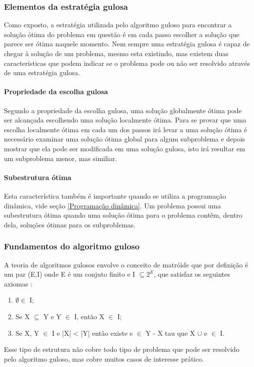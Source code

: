 \subsubsection{Elementos da estratégia gulosa}
Como exposto, a estratégia utilizada pelo algoritmo guloso para encontrar a solução ótima do problema em questão é em cada passo escolher a solução que parece ser ótima naquele momento. Nem sempre uma estratégia gulosa é capaz de chegar à solução de um problema, mesmo esta existindo, mas existem duas características que podem indicar se o problema pode ou não ser resolvido através de uma estratégia gulosa.
\paragraph{Propriedade da escolha gulosa}
Segundo a propriedade da escolha gulosa, uma solução globalmente ótima pode ser alcançada escolhendo uma solução localmente ótima. Para se provar que uma escolha localmente ótima em cada um dos passos irá levar a uma solução ótima é necessário examinar uma solução ótima global para algum subproblema e depois mostrar que ela pode ser modificada em uma solução gulosa, isto irá resultar em um subproblema menor, mas similiar.
\paragraph{Subestrutura ótima}
Esta característica também é importante quando se utiliza a programação dinâmica, vide seção \ref{Programação dinâmica}. Um problema possui uma subestrutura ótima quando uma solução ótima para o problema contêm, dentro dela, soluções ótimas para os subproblemas.
\subsubsection{Fundamentos do algoritmo guloso}
A teoria de algoritmos gulosos envolve o conceito de matróide que por definição é um par (E,I) onde E é um conjuto finito e I $\subseteq 2^{E}$, que satisfaz os seguintes axiomas \cite{paulo2007cobertura}:
\begin{enumerate}[label=(\roman*)]
\item $\emptyset \in$ I;
\item Se X $\subseteq$ Y e Y $\in$ I, então X $\in$ I;
\item Se X, Y $\in$ I e |X| < |Y| então existe e $\in$ Y - X tau que X $\cup$ e $\in$ I.
\end{enumerate}
Esse tipo de estrutura não cobre todo tipo de problema que pode ser resolvido pelo algoritmo guloso, mas cobre muitos casos de interesse prático.

